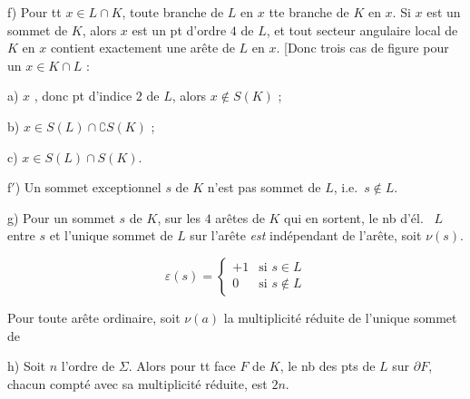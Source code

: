 \documentclass[11pt,a4paper]{article}
\begin{document}
f) Pour tt $x \in L \cap K$, toute branche de $L$ en $x$  tte branche de $K$ en $x$. Si $x$ est un sommet de $K$, alors $x$ est un pt d'ordre $4$  de $L$, et tout secteur angulaire local de $K$ en $x$ \struck{\ill{}}  contient exactement une arête de $L$  en $x$. [Donc trois cas de figure pour un $x \in K \cap L$ :

a) $x$  , donc pt d'indice $2$ de $L$, alors $x \notin S(K)$ ;

b) $x \in S(L) \cap \complement S(K)$ ;

c) $x \in S(L) \cap S(K)$.

f$'$) Un sommet exceptionnel $s$ de $K$ n'est pas sommet de $L$, i.e.\ $s \notin L$.

g)  Pour un sommet \struck{\ill{}}  $s$ de $K$, sur les $4$ arêtes  de $K$ qui en sortent, le nb d'él.\ \struck{\ill{} \ill{}}  $L$  entre $s$ et l'unique sommet de $L$ sur l'arête \struck{\ill{} \ill{} \ill{}} \emph{est} indépendant de l'arête, soit $\nu(s)$.

\[
\varepsilon(s) = \left\lbrace \begin{array}{ll} +1 & \text{si } s \in L \\ 0 & \text{si } s \notin L \end{array} \right.
\]

Pour toute arête ordinaire, soit $\nu(a)$ la multiplicité réduite de l'unique sommet de \ill{}

h)  Soit $n$ l'ordre de $\Sigma$. Alors pour tt face $F$ de $K$, le nb des pts de $L$ sur $\partial F$, chacun compté avec sa multiplicité réduite, est $2n$.
\end{document}
